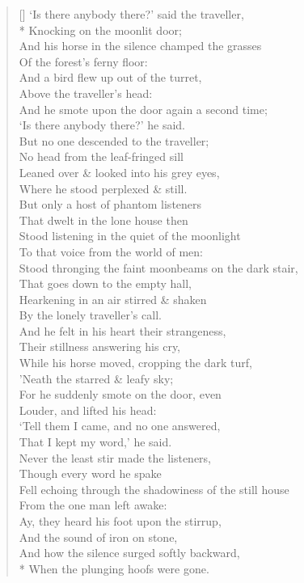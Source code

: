 \documentclass[MAIN]{subfiles}
\begin{document}
\settowidth{\versewidth}{``Is there anybody there?'' said the traveller,}
\begin{verse}[\versewidth]
`Is there anybody there?' said the traveller,\\*
\vin Knocking on the moonlit door;\\
And his horse in the silence champed the grasses\\
\vin Of the forest's ferny floor:\\
And a bird flew up out of the turret,\\
\vin Above the traveller's head:\\
And he smote upon the door again a second time;\\
\vin `Is there anybody there?' he said.\\
But no one descended to the traveller;\\
\vin No head from the leaf-fringed sill\\
Leaned over \& looked into his grey eyes,\\
\vin Where he stood perplexed \& still.\\
But only a host of phantom listeners\\
\vin That dwelt in the lone house then\\
Stood listening in the quiet of the moonlight\\
\vin To that voice from the world of men:\\
Stood thronging the faint moonbeams on the dark stair,\\
\vin That goes down to the empty hall,\\
Hearkening in an air stirred \& shaken\\
\vin By the lonely traveller's call.\\
And he felt in his heart their strangeness,\\
\vin Their stillness answering his cry,\\
While his horse moved, cropping the dark turf,\\
\vin 'Neath the starred \& leafy sky;\\
For he suddenly smote on the door, even\\
\vin Louder, and lifted his head:\\
`Tell them I came, and no one answered,\\
\vin That I kept my word,' he said.\\
Never the least stir made the listeners,\\
\vin Though every word he spake\\
Fell echoing through the shadowiness of the still house\\
\vin From the one man left awake:\\
Ay, they heard his foot upon the stirrup,\\
\vin And the sound of iron on stone,\\
And how the silence surged softly backward,\\*
\vin When the plunging hoofs were gone.
\end{verse}
\end{document}
